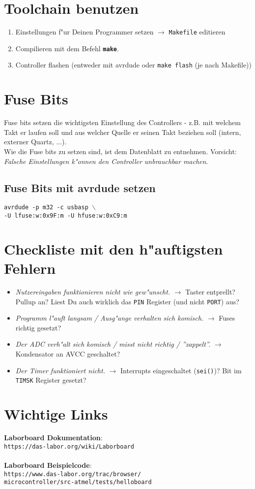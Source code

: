 \documentclass[11pt,a4paper,smallheadings,twocolumn,headexclude,footexclude]{scrartcl}
\begin{document}
\section*{Toolchain benutzen}
\begin{enumerate}
	\item Einstellungen f"ur Deinen Programmer setzen
		$\rightarrow$ \texttt{Makefile} editieren
	\item Compilieren mit dem Befehl {\bf\texttt{make}}.
	\item Controller flashen (entweder mit avrdude oder \texttt{make flash} (je nach Makefile))
\end{enumerate}

\section*{Fuse Bits}
Fuse bits setzen die wichtigsten Einstellung des Controllers - z.B. mit welchem Takt
er laufen soll und aus welcher Quelle er seinen Takt beziehen soll (intern, externer
Quartz, ...).\\
Wie die Fuse bits zu setzen sind, ist dem Datenblatt zu entnehmen. Vorsicht:
\emph{Falsche Einstellungen k"onnen den Controller unbrauchbar machen}.
\subsection*{Fuse Bits mit avrdude setzen}
\texttt{avrdude -p m32 -c usbasp $\backslash$\\-U lfuse:w:0x9F:m -U hfuse:w:0xC9:m}


\section*{Checkliste mit den h"auftigsten Fehlern}
\begin{itemize}
	\item \emph{Nutzereingaben funktionieren nicht wie gew"unscht.}
		$\rightarrow$ Taster entprellt? Pullup an? Liest Du auch wirklich
		das \texttt{PIN} Register (und nicht \texttt{PORT}) aus?
	\item \emph{Programm l"auft langsam / Ausg"ange verhalten sich komisch.}
		$\rightarrow$ Fuses richtig gesetzt?
	\item \emph{Der ADC verh"alt sich komisch / misst nicht richtig / ''zappelt''.}
		$\rightarrow$ Kondensator an AVCC geschaltet?
	\item \emph{Der Timer funktioniert nicht.}
		$\rightarrow$ Interrupts eingeschaltet (\texttt{sei()})? Bit im \texttt{TIMSK} Register gesetzt?
\end{itemize}

\section*{Wichtige Links}
{\bf Laborboard Dokumentation}:\\\texttt{https://das-labor.org/wiki/Laborboard}\\
\\
{\bf Laborboard Beispielcode}:\\
\texttt{https://www.das-labor.org/trac/browser/\\microcontroller/src-atmel/tests/helloboard}
\end{document}
